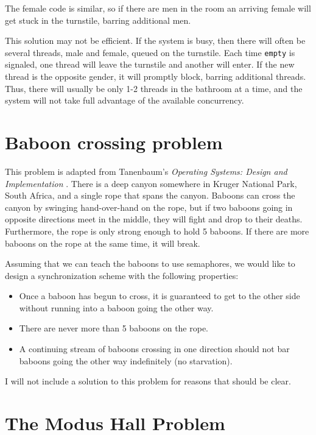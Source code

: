 \documentclass{book}
\begin{document}
The female code is similar, so if there are men in the room an
arriving female will get stuck in the turnstile, barring additional
men.

This solution may not be efficient.  If
the system is busy, then there will often be several threads, male and
female, queued on the turnstile.  Each time {\tt empty} is signaled,
one thread will leave the turnstile and another will enter.  If the
new thread is the opposite gender, it will promptly block, barring
additional threads.  Thus, there will usually be only 1-2 threads in
the bathroom at a time, and the system will not take full advantage
of the available concurrency.


\section{Baboon crossing problem}

This problem is adapted from Tanenbaum's {\em Operating Systems:
Design and Implementation} \cite{tanenbaum}.
There is a deep canyon somewhere in
Kruger National Park, South Africa, and a single rope that spans the
canyon.  Baboons can cross the canyon by swinging hand-over-hand on
the rope, but if two baboons going in opposite directions meet in the
middle, they will fight and drop to their deaths.  Furthermore,
the rope is only strong enough to hold 5 baboons.  If there are
more baboons on the rope at the same time, it will break.

Assuming that we can teach the baboons to use semaphores, we
would like to design a synchronization scheme with the following
properties:

\begin{itemize}

\item Once a baboon has begun to cross, it is guaranteed
to get to the other side without running into a baboon going
the other way.

\item There are never more than 5 baboons on the rope.

\item A continuing stream of baboons crossing in one direction
should not bar baboons going the other way indefinitely
(no starvation).

\end{itemize}

I will not include a solution to this problem for reasons that
should be clear.


\section{The Modus Hall Problem}
\end{document}
